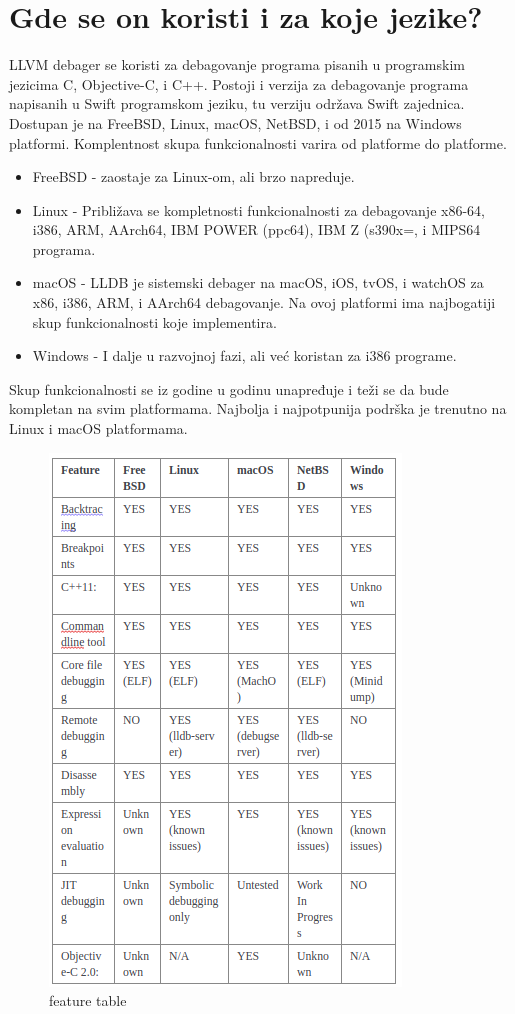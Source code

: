 \documentclass[a4paper]{article}
\begin{document}
\section{Gde se on koristi i za koje jezike? }
\label{sec: Gde se on koristi i za koje jezike?}
LLVM debager se koristi za debagovanje programa pisanih u programskim jezicima C, Objective-C, i C++. Postoji i verzija za debagovanje programa napisanih u Swift programskom jeziku, tu verziju održava Swift zajednica. 
Dostupan je na FreeBSD, Linux, macOS, NetBSD, i od 2015 na Windows platformi. Komplentnost skupa funkcionalnosti varira od platforme do platforme.
\begin{itemize}
\item FreeBSD - zaostaje za Linux-om, ali brzo napreduje.
\item Linux - Približava se kompletnosti funkcionalnosti za debagovanje x86-64, i386, ARM, AArch64, IBM POWER (ppc64), IBM Z (s390x=, i MIPS64 programa.
\item macOS - LLDB je sistemski debager na macOS, iOS, tvOS, i watchOS za x86, i386, ARM, i AArch64 debagovanje. Na ovoj platformi ima najbogatiji skup funkcionalnosti koje implementira.
\item Windows - I dalje u razvojnoj fazi, ali već koristan za i386 programe.
\end{itemize}
Skup funkcionalnosti se iz godine u godinu unapređuje i teži se da bude kompletan na svim platformama. Najbolja i najpotpunija podrška je trenutno na Linux i macOS platformama.


\begin{figure}[h!]
	\begin{center}
		\includegraphics[scale=0.8]{Slike/marko_tabela.png}
	\end{center}
	\caption{feature table}
	\label{fig:feature_table}
\end{figure}
\end{document}
